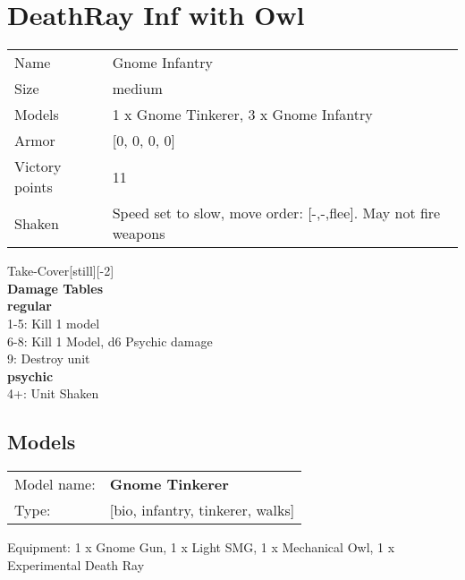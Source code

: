  















\clearpage

\section{ DeathRay Inf with Owl }

\begin{tabular}{ll}
  Name & Gnome Infantry \\
  Size & medium\\
  Models & 1 x Gnome Tinkerer, 3 x Gnome Infantry\\
  Armor & [0, 0, 0, 0]\\
  Victory points & 11\\
  Shaken & Speed set to slow, move order: [-,-,flee]. May not fire weapons\\
\end{tabular}

Take-Cover[still][-2]\\ 



{\bf Damage Tables} \\
 {\bf regular } \\
1-5: Kill 1 model \\
6-8: Kill 1 Model, d6 Psychic damage \\
9: Destroy unit \\
 {\bf psychic } \\
4+: Unit Shaken \\


\clearpage

\subsection{ Models }

\begin{tabular}{ll}
Model name: & {\bf Gnome Tinkerer } \\
Type: & [bio, infantry, tinkerer, walks] \\
\end{tabular}

Equipment: 1 x Gnome Gun, 1 x Light SMG, 1 x Mechanical Owl, 1 x Experimental Death Ray \\

